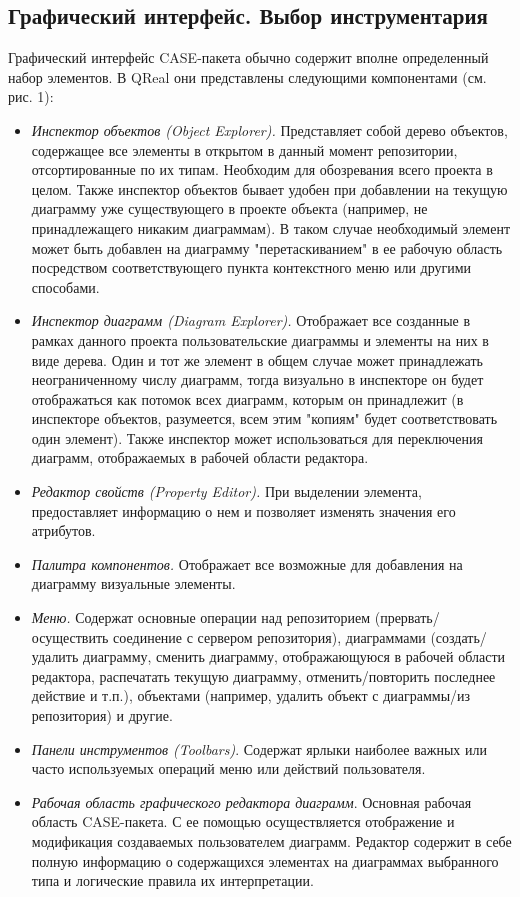 \documentclass[a5paper]{article}
\begin{document}
\subsection{Графический интерфейс. Выбор инструментария}

Графический интерфейс CASE-пакета обычно
содержит вполне определенный набор элементов. В
QReal они представлены следующими
компонентами (см. рис. 1):

\begin{itemize}
  \item \textit{Инспектор объектов (Object Explorer).} Представляет
        собой дерево объектов, содержащее все элементы в открытом в данный
        момент репозитории, отсортированные по их типам. Необходим для
        обозревания всего проекта в целом. Также инспектор объектов бывает
        удобен при добавлении на текущую диаграмму уже существующего
        в проекте объекта (например, не принадлежащего никаким диаграммам). В
        таком случае необходимый элемент может быть добавлен на диаграмму
        "перетаскиванием" в ее рабочую область посредством соответствующего
        пункта контекстного меню или другими способами.
  \item \textit{Инспектор диаграмм (Diagram Explorer).} Отображает все
        созданные в рамках данного проекта пользовательские диаграммы и
        элементы на них в виде дерева. Один и тот же элемент в общем случае
        может принадлежать неограниченному числу диаграмм, тогда визуально в
        инспекторе он будет отображаться как потомок всех диаграмм, которым он
        принадлежит (в инспекторе объектов, разумеется, всем этим "копиям"
        будет соответствовать один элемент). Также инспектор может
        использоваться для переключения диаграмм, отображаемых в рабочей
        области редактора.
  \item \textit{Редактор свойств (Property Editor).} При выделении
    элемента, предоставляет информацию о нем и позволяет изменять значения
        его атрибутов.
  \item \textit{Палитра компонентов.} Отображает все возможные для добавления на
        диаграмму визуальные элементы.
  \item \textit{Меню.} Содержат основные операции над репозиторием
        (прервать/осуществить соединение с сервером репозитория), диаграммами
        (создать/удалить диаграмму, сменить диаграмму, отображающуюся в рабочей
        области редактора, распечатать текущую диаграмму, отменить/повторить
        последнее действие и т.п.), объектами (например, удалить объект с
        диаграммы/из репозитория) и другие.
  \item \textit{Панели инструментов (Toolbars)}. Содержат
        ярлыки наиболее важных или часто используемых операций меню или
        действий пользователя.
  \item \textit{Рабочая область графического редактора диаграмм}. Основная
        рабочая область CASE-пакета. С ее помощью
        осуществляется отображение и модификация создаваемых пользователем
        диаграмм. Редактор содержит в себе полную информацию о содержащихся
        элементах на диаграммах выбранного типа и логические правила их
        интерпретации.
\end{itemize}
\end{document}
